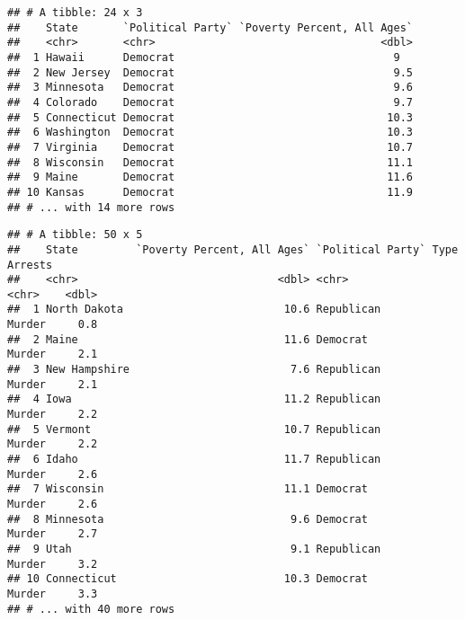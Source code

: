 \documentclass[]{article}
\newenvironment{Shaded}{\begin{snugshade}}{\end{snugshade}}
\newcommand{\CommentTok}[1]{\textcolor[rgb]{0.56,0.35,0.01}{\textit{#1}}}
\newcommand{\KeywordTok}[1]{\textcolor[rgb]{0.13,0.29,0.53}{\textbf{#1}}}
\newcommand{\NormalTok}[1]{#1}
\newcommand{\OperatorTok}[1]{\textcolor[rgb]{0.81,0.36,0.00}{\textbf{#1}}}
\newcommand{\StringTok}[1]{\textcolor[rgb]{0.31,0.60,0.02}{#1}}
\begin{document}
\begin{verbatim}
## # A tibble: 24 x 3
##    State       `Political Party` `Poverty Percent, All Ages`
##    <chr>       <chr>                                   <dbl>
##  1 Hawaii      Democrat                                  9  
##  2 New Jersey  Democrat                                  9.5
##  3 Minnesota   Democrat                                  9.6
##  4 Colorado    Democrat                                  9.7
##  5 Connecticut Democrat                                 10.3
##  6 Washington  Democrat                                 10.3
##  7 Virginia    Democrat                                 10.7
##  8 Wisconsin   Democrat                                 11.1
##  9 Maine       Democrat                                 11.6
## 10 Kansas      Democrat                                 11.9
## # ... with 14 more rows
\end{verbatim}

\begin{Shaded}
\end{Shaded}

\begin{verbatim}
## # A tibble: 50 x 5
##    State         `Poverty Percent, All Ages` `Political Party` Type   Arrests
##    <chr>                               <dbl> <chr>             <chr>    <dbl>
##  1 North Dakota                         10.6 Republican        Murder     0.8
##  2 Maine                                11.6 Democrat          Murder     2.1
##  3 New Hampshire                         7.6 Republican        Murder     2.1
##  4 Iowa                                 11.2 Republican        Murder     2.2
##  5 Vermont                              10.7 Republican        Murder     2.2
##  6 Idaho                                11.7 Republican        Murder     2.6
##  7 Wisconsin                            11.1 Democrat          Murder     2.6
##  8 Minnesota                             9.6 Democrat          Murder     2.7
##  9 Utah                                  9.1 Republican        Murder     3.2
## 10 Connecticut                          10.3 Democrat          Murder     3.3
## # ... with 40 more rows
\end{verbatim}
\end{document}
